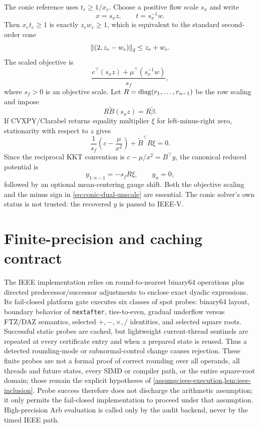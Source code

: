 The conic reference uses $t_e\ge1/x_e$.  Choose a positive flow scale $s_x$ and
write
\begin{equation}
 x=s_xz,\qquad t=s_x^{-1}w.
\end{equation}
Then $x_et_e\ge1$ is exactly $z_ew_e\ge1$, which is equivalent to the standard
second-order cone
\begin{equation}
 \left\lVert(2,z_e-w_e)\right\rVert_2\le z_e+w_e.
\end{equation}
The scaled objective is
\begin{equation}
 \frac{c^\top(s_xz)+\mu^\top(s_x^{-1}w)}{s_f},
\end{equation}
where $s_f>0$ is an objective scale.  Let
$R=\operatorname{diag}(r_1,\ldots,r_{n-1})$ be the row scaling and impose
\begin{equation}
 R\widetilde B(s_xz)=R\widetilde\beta.
\end{equation}
If CVXPY/Clarabel returns equality multiplier $\xi$ for left-minus-right zero,
stationarity with respect to $z$ gives
\begin{equation}
 \frac1{s_f}\left(c-\frac{\mu}{x^2}\right)
 +\widetilde B^\top R\xi=0.
\end{equation}
Since the reciprocal KKT convention is
$c-\mu/x^2=B^\top y$, the canonical reduced potential is
\begin{equation}
 y_{1:n-1}=-s_fR\xi,
 \qquad y_n=0,
 \label{eq:conic-dual-unscale}
\end{equation}
followed by an optional mean-centering gauge shift.  Both the objective scaling
and the minus sign in \cref{eq:conic-dual-unscale} are essential.  The conic
solver's own status is not trusted: the recovered $y$ is passed to IEEE-V.

\section{Finite-precision and caching contract}
\label{app:finite}

The IEEE implementation relies on round-to-nearest binary64 operations plus
directed predecessor/successor adjustments to enclose exact dyadic expressions.
Its fail-closed platform gate executes six classes of spot probes: binary64
layout, boundary behavior of \texttt{nextafter}, ties-to-even, gradual
underflow versus FTZ/DAZ semantics, selected $+,-,\times,/$ identities, and
selected square roots.  Successful static probes are cached, but lightweight
current-thread sentinels are repeated at every certificate entry and when a
prepared state is reused.  Thus a detected rounding-mode or subnormal-control
change causes rejection.  These finite probes are not a formal proof of correct
rounding over all operands, all threads and future states, every SIMD or compiler
path, or the entire square-root domain; those remain the explicit hypotheses of
\cref{assump:ieee-execution,lem:ieee-inclusion}.  Probe success therefore does
not discharge the arithmetic assumption; it only permits the fail-closed
implementation to proceed under that assumption.  High-precision Arb evaluation
is called only by the audit backend, never by the timed IEEE path.

